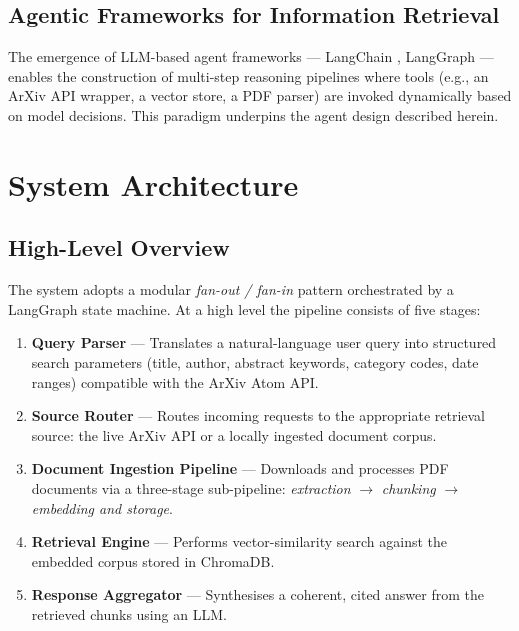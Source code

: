 \documentclass[12pt, a4paper]{article}
\begin{document}
\subsection{Agentic Frameworks for Information Retrieval}

The emergence of LLM-based agent frameworks --- LangChain \cite{langchain},
LangGraph \cite{langgraph} --- enables the construction of multi-step
reasoning pipelines where tools (e.g., an ArXiv API wrapper, a vector
store, a PDF parser) are invoked dynamically based on model decisions.
This paradigm underpins the agent design described herein.

\section{System Architecture}
\label{sec:arch}

\subsection{High-Level Overview}

The system adopts a modular \emph{fan-out / fan-in} pattern orchestrated
by a LangGraph state machine. At a high level the pipeline consists of
five stages:

\begin{enumerate}[leftmargin=*, label=\textbf{\arabic*.}]
    \item \textbf{Query Parser} --- Translates a natural-language user
          query into structured search parameters (title, author, abstract
          keywords, category codes, date ranges) compatible with the
          ArXiv Atom API.
    \item \textbf{Source Router} --- Routes incoming requests to the
          appropriate retrieval source: the live ArXiv API or a locally
          ingested document corpus.
    \item \textbf{Document Ingestion Pipeline} --- Downloads and processes
          PDF documents via a three-stage sub-pipeline:
          \emph{extraction} $\rightarrow$ \emph{chunking}
          $\rightarrow$ \emph{embedding and storage}.
    \item \textbf{Retrieval Engine} --- Performs vector-similarity search
          against the embedded corpus stored in ChromaDB.
    \item \textbf{Response Aggregator} --- Synthesises a coherent,
          cited answer from the retrieved chunks using an LLM.
\end{enumerate}
\end{document}
